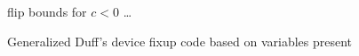 \begin{figure}[H]
    \begin{algorithmic}
             \Comment flip bounds for $c < 0$
                \State {}
            \EndCase
                \State {}
            \EndCase
            \State \ldots
                \State {}
            \EndCase
        \EndSwitch
    \end{algorithmic}
    \caption{Generalized Duff's device fixup code based on variables present}
    \label{fig:impl:fixup:duff:fixup-bound}
\end{figure}